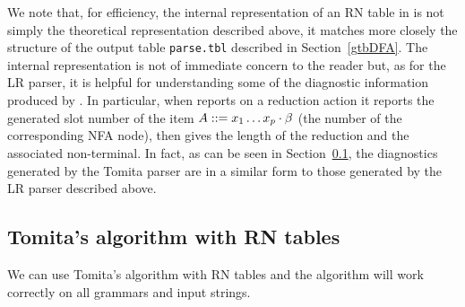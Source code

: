 We note that, for efficiency, the internal representation of an RN
table in \gtb is not simply the theoretical representation described
above, it matches more closely the structure of the output table
\verb+parse.tbl+ described in Section~\ref{gtbDFA}. 
The internal representation is not of immediate concern to the
reader but, as for the LR parser, 
it is helpful for understanding some of the diagnostic
information produced by \gtbs. In particular, when \gtb reports on a
reduction action it reports the \gtb generated slot number of the item
$A::= x_1\ldots x_p\cdot\beta$ (the number of the corresponding NFA
node), then gives the length of the reduction and the associated 
non-terminal.
In fact, as can be seen in Section~\ref{rntom}, the diagnostics
generated by the Tomita parser are in a similar form to those
generated by the LR parser described above.

\subsection{Tomita's algorithm with RN tables}\label{rntom}

We can use Tomita's algorithm with RN tables and the algorithm will
work correctly on all grammars and input strings.

